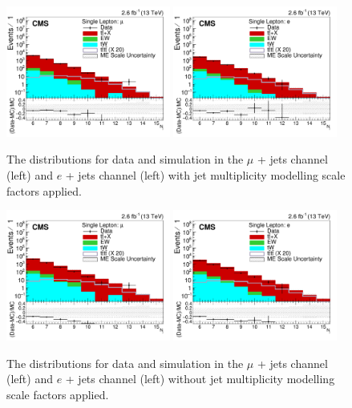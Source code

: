 \begin{figure}[ht!]
    \includegraphics[width=0.48\textwidth]{images/Run2/nJets_StackLogY.pdf}
    \includegraphics[width=0.48\textwidth]{images/Run2/nJets_StackLogY_e.pdf}
    \caption{The \njets distributions for data and simulation in the $\mu$ + jets channel (left) and $e$ + jets channel (left) with jet multiplicity modelling scale factors applied.}
    \label{fig:withAlpha}
\end{figure}

\begin{figure}[ht!]
    \includegraphics[width=0.48\textwidth]{images/Run2/nJets_StackLogY_woAlphaS.pdf}
    \includegraphics[width=0.48\textwidth]{images/Run2/nJets_StackLogY_e_woAlphaS.pdf}
    \caption{The \njets distributions for data and simulation in the $\mu$ + jets channel (left) and $e$ + jets channel (left) without jet multiplicity modelling scale factors applied.}
    \label{fig:withoutAlpha}
\end{figure}

